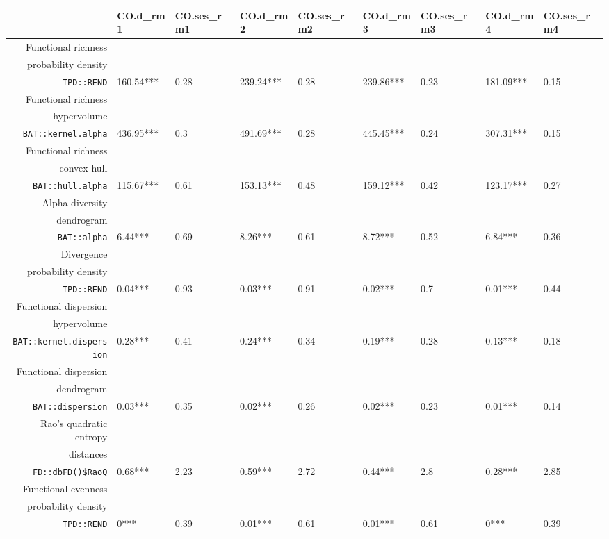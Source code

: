 \begin{table}[ht]
\centering
\scriptsize
\begin{tabular}{rllllllll}
  \hline
 & CO.d\_rm1 & CO.ses\_rm1 & CO.d\_rm2 & CO.ses\_rm2 & CO.d\_rm3 & CO.ses\_rm3 & CO.d\_rm4 & CO.ses\_rm4 \\ 
  \hline
Functional richness\\ probability density\\ \texttt{TPD::REND} & 160.54*** & 0.28 & 239.24*** & 0.28 & 239.86*** & 0.23 & 181.09*** & 0.15 \\ 
  Functional richness\\ hypervolume\\ \texttt{BAT::kernel.alpha} & 436.95*** & 0.3 & 491.69*** & 0.28 & 445.45*** & 0.24 & 307.31*** & 0.15 \\ 
  Functional richness\\ convex hull\\ \texttt{BAT::hull.alpha} & 115.67*** & 0.61 & 153.13*** & 0.48 & 159.12*** & 0.42 & 123.17*** & 0.27 \\ 
  Alpha diversity\\ dendrogram\\ \texttt{BAT::alpha} & 6.44*** & 0.69 & 8.26*** & 0.61 & 8.72*** & 0.52 & 6.84*** & 0.36 \\ 
  Divergence\\ probability density\\ \texttt{TPD::REND} & 0.04*** & 0.93 & 0.03*** & 0.91 & 0.02*** & 0.7 & 0.01*** & 0.44 \\ 
  Functional dispersion\\ hypervolume\\ \texttt{BAT::kernel.dispersion} & 0.28*** & 0.41 & 0.24*** & 0.34 & 0.19*** & 0.28 & 0.13*** & 0.18 \\ 
  Functional dispersion\\ dendrogram\\ \texttt{BAT::dispersion} & 0.03*** & 0.35 & 0.02*** & 0.26 & 0.02*** & 0.23 & 0.01*** & 0.14 \\ 
  Rao's quadratic entropy\\ distances\\ \texttt{FD::dbFD()\$RaoQ} & 0.68*** & 2.23 & 0.59*** & 2.72 & 0.44*** & 2.8 & 0.28*** & 2.85 \\ 
  Functional evenness\\ probability density\\ \texttt{TPD::REND} & 0*** & 0.39 & 0.01*** & 0.61 & 0.01*** & 0.61 & 0*** & 0.39 \\ 

\end{tabular}
\end{table}
